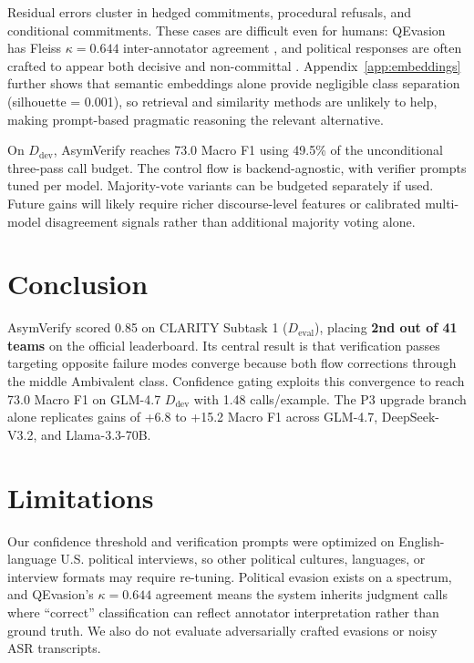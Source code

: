 \documentclass[11pt]{article}
\newcommand{\rev}[1]{#1}
\begin{document}
Residual errors cluster in hedged commitments, procedural refusals, and conditional commitments. These cases are difficult even for humans: QEvasion has Fleiss $\kappa = 0.644$ inter-annotator agreement \citep{thomas-etal-2024-never}, and political responses are often crafted to appear both decisive and non-committal \citep{clayman2001answers,clayman2002news,clementson2018deceptively}. Appendix~\ref{app:embeddings} further shows that semantic embeddings alone provide negligible class separation (silhouette = 0.001), so retrieval and similarity methods are unlikely to help, making prompt-based pragmatic reasoning the relevant alternative.

\rev{On $D_{\text{dev}}$, AsymVerify reaches 73.0 Macro F1 using 49.5\% of the unconditional three-pass call budget. The control flow is backend-agnostic, with verifier prompts tuned per model.} Majority-vote variants can be budgeted separately if used. Future gains will likely require richer discourse-level features or calibrated multi-model disagreement signals rather than additional majority voting alone.

\section{Conclusion}

AsymVerify \rev{scored 0.85 on CLARITY Subtask 1} ($D_{\text{eval}}$), placing \textbf{2nd out of 41 teams} on the official leaderboard. Its central result is that verification passes targeting opposite failure modes converge because both flow corrections through the middle Ambivalent class. Confidence gating exploits this convergence to reach 73.0 Macro F1 on GLM-4.7 $D_{\text{dev}}$ with 1.48 calls/example. The P3 upgrade branch alone replicates gains of +6.8 to +15.2 Macro F1 across GLM-4.7, DeepSeek-V3.2, and Llama-3.3-70B.

\section*{Limitations}

Our confidence threshold and verification prompts were optimized on English-language U.S. political interviews, so other political cultures, languages, or interview formats may require re-tuning. Political evasion exists on a spectrum, and QEvasion's $\kappa=0.644$ agreement means the system inherits judgment calls where ``correct'' classification can reflect annotator interpretation rather than ground truth. We also do not evaluate adversarially crafted evasions or noisy ASR transcripts.
\end{document}
